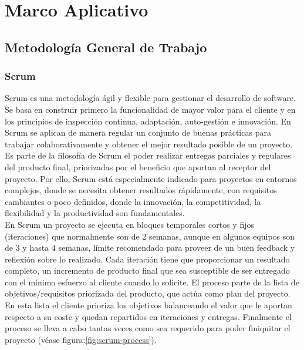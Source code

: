 
\part{Marco Aplicativo}
\chapter{Metodología General de Trabajo}

\section{Scrum}
Scrum es una metodología ágil y flexible para gestionar el desarrollo de software. Se basa en construir primero la funcionalidad de mayor valor para el cliente y en los principios de inspección continua, adaptación, auto-gestión e innovación\cite{scrumsofteng}. En Scrum se aplican de manera regular un conjunto de buenas prácticas para trabajar colaborativamente y obtener el mejor resultado posible de un proyecto.\\

Es parte de la filosofía de Scrum el poder realizar entregas parciales y regulares del producto final, priorizadas por el beneficio que aportan al receptor del proyecto. Por ello, Scrum está especialmente indicado para proyectos en entornos complejos, donde se necesita obtener resultados rápidamente, con requisitos cambiantes o poco definidos, donde la innovación, la competitividad, la flexibilidad y la productividad son fundamentales.\\

En Scrum un proyecto se ejecuta en bloques temporales cortos y fijos (iteraciones) que normalmente son de 2 semanas, aunque en algunos equipos son de 3 y hasta 4 semanas, límite recomendado para proveer de un buen feedback y reflexión sobre lo realizado. Cada iteración tiene que proporcionar un resultado completo, un incremento de producto final que sea susceptible de ser entregado con el mínimo esfuerzo al cliente cuando lo solicite. El proceso parte de la lista de objetivos/requisitos priorizada del producto, que actúa como plan del proyecto. En esta lista el cliente prioriza los objetivos balanceando el valor que le aportan respecto a su coste y quedan repartidos en iteraciones y entregas. Finalmente el proceso se lleva a cabo tantas veces como sea requerido para poder finiquitar el proyecto (véase figura:\ref{fig:scrum-process}).\\  

